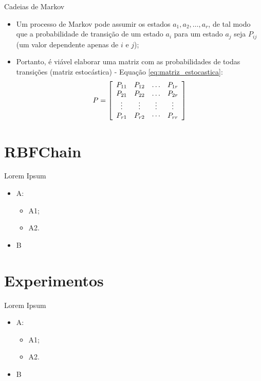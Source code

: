 \documentclass[10pt]{beamer}
\begin{document}
\begin{frame}{Cadeias de Markov}
    \begin{itemize}
        \item<1 -> Um processo de Markov pode assumir os estados $a_1, a_2, \ldots, a_r$, de tal modo que a probabilidade de transição de um estado $a_i$ para um estado $a_j$ seja $P_{ij}$ (um valor dependente apenas de $i$ e $j$);
        \item<2 -> Portanto, é viável elaborar uma matriz com as probabilidades de todas transições (matriz estocástica) - Equação \ref{eq:matriz_estocastica}:
        \begin{equation}
            \label{eq:matriz_estocastica}
            P = \left[ \begin{array} { c c c c } { P _ { 11 } } & { P _ { 12 } } & { \dots } & { P _ { 1 r } } \\ { P _ { 21 } } & { P _ { 22 } } & { \dots } & { P _ { 2 r } } \\ { \vdots } & { \vdots } & { \vdots } & { \vdots } \\ { P _ { r 1 } } & { P _ { r 2 } } & { \cdots } & { P _ { r r } } \end{array} \right]
        \end{equation}
      \end{itemize}
\end{frame}


\section{RBFChain}

\begin{frame}{Lorem Ipsum}
    \begin{itemize}
        \item<1 -> A:
        \begin{itemize}
            \item<2 -> A1;
            \item<2 -> A2.
        \end{itemize}
        \item<3 -> B
      \end{itemize}
\end{frame}

\section{Experimentos}

\begin{frame}{Lorem Ipsum}
    \begin{itemize}
        \item<1 -> A:
        \begin{itemize}
            \item<2 -> A1;
            \item<2 -> A2.
        \end{itemize}
        \item<3 -> B
      \end{itemize}
\end{frame}
\end{document}
